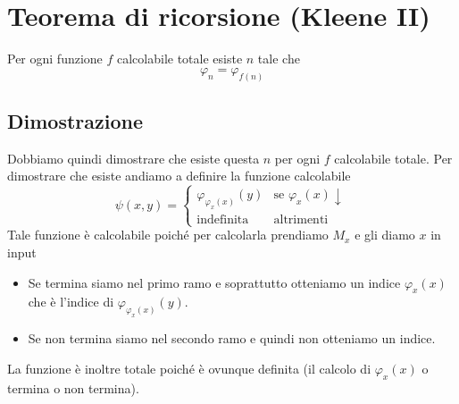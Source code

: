 \section{Teorema di ricorsione (Kleene II)}

Per ogni funzione $f$ calcolabile totale esiste $n$ tale che
\[ \varphi_n = \varphi_{f(n)} \]

\subsection{Dimostrazione}

Dobbiamo quindi dimostrare che esiste questa $n$ per ogni $f$
calcolabile totale. Per dimostrare che esiste andiamo a definire
la funzione calcolabile
\[
	\psi (x, y) = \begin{cases}
		\varphi_{\varphi_x(x)} (y) & \text{se } \varphi_x (x) \downarrow \\
		\text{indefinita}          & \text{altrimenti}
	\end{cases}
\]
Tale funzione è calcolabile poiché per calcolarla prendiamo
$M_x$ e gli diamo $x$ in input
\begin{itemize}
	\item Se termina siamo nel primo ramo e soprattutto
	      otteniamo un indice $\varphi_x(x)$ che è l'indice di
	      $\varphi_{\varphi_x(x)} (y)$.
	\item Se non termina siamo nel secondo ramo e quindi non
	      otteniamo un indice.
\end{itemize}
La funzione è inoltre totale poiché è ovunque definita (il
calcolo di $\varphi_x (x)$ o termina o non termina).

